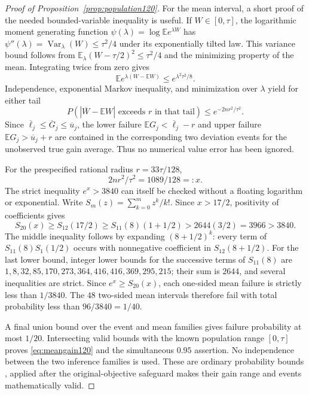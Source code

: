 \begin{proof}[Proof of Proposition~\ref{prop:population120}]
For the mean interval, a short proof of the needed
bounded-variable inequality is useful.  If $W\in[0,\tau]$,
the logarithmic moment generating function
$\psi(\lambda)=\log\mathbb E e^{\lambda W}$ has
$\psi''(\lambda)=\operatorname{Var}_\lambda(W)
\le\tau^2/4$ under its exponentially tilted law.
This variance bound follows from
$\mathbb E_\lambda(W-\tau/2)^2\le\tau^2/4$ and
the minimizing property of the mean.
Integrating twice from zero gives
\[
 \mathbb E e^{\lambda(W-\mathbb EW)}
 \le e^{\lambda^2\tau^2/8}.
\]
Independence, exponential Markov inequality, and minimization
over $\lambda$ yield for either tail
\[
 P\left(\left|\overline W-\mathbb EW\right|
       \text{ exceeds }r\text{ in that tail}\right)
 \le e^{-2nr^2/\tau^2}.
\]
Since $\overline\ell_j\le\overline G_j\le\overline u_j$,
the lower failure
$\mathbb EG_j<\overline\ell_j-r$ and upper failure
$\mathbb EG_j>\overline u_j+r$ are contained in the
corresponding two deviation events for the unobserved
true gain average.  Thus no numerical value error has
been ignored.

For the prespecified rational radius $r=33\tau/128$,
\[
 2nr^2/\tau^2=1089/128=:x.
\]
The strict inequality $e^x>3840$ can itself be checked
without a floating logarithm or exponential.
Write $S_m(z)=\sum_{k=0}^m z^k/k!$.
Since $x>17/2$, positivity of coefficients gives
\[
 S_{20}(x)\ge S_{12}(17/2)
       \ge S_{11}(8)(1+1/2)>2644(3/2)=3966>3840.
\]
The middle inequality follows by expanding
$(8+1/2)^k$: every term of
$S_{11}(8)S_1(1/2)$ occurs with nonnegative coefficient
in $S_{12}(8+1/2)$.
For the last lower bound, integer lower bounds for the
successive terms of $S_{11}(8)$ are
$1,8,32,85,170,273,364,416,416,369,295,215$;
their sum is $2644$, and several inequalities are strict.
Since $e^x\ge S_{20}(x)$, each one-sided mean failure
is strictly less than $1/3840$.
The $48$ two-sided mean intervals therefore fail with
total probability less than $96/3840=1/40$.

A final union bound over the event and mean families
gives failure probability at most $1/20$.
Intersecting valid bounds with the known population
range $[0,\tau]$ proves \eqref{eq:meangain120} and the
simultaneous $0.95$ assertion.
No independence between the two inference families is
used.  These are ordinary probability bounds
\citep{clopperpearson1934,hoeffding1963}, applied after
the original-objective safeguard makes their gain
range and events mathematically valid.
\end{proof}
